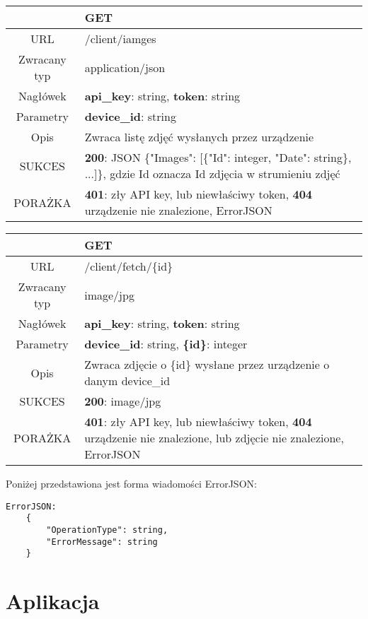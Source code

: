 \begin{description}
		\begin{tabularx}{\linewidth} {|c|X|}
		\hline
						& {\bf GET}\\ \hline
		  URL 			& /client/iamges\\
		  Zwracany typ 	& application/json\\
		  Nagłówek 		& {\bf api\_key}: string, {\bf token}: string\\
		  Parametry 	& {\bf device\_id}: string\\
		  Opis 			& Zwraca listę zdjęć wysłanych przez urządzenie \\
		  SUKCES 		& {\bf 200}: JSON \{"Images": [\{"Id": integer, "Date": string\}, ...]\}, gdzie Id oznacza Id zdjęcia w strumieniu zdjęć \\
		  PORAŻKA 		& {\bf 401}: zły API key, lub niewłaściwy token, {\bf 404} urządzenie nie znalezione, ErrorJSON\\
		  \hline
		\end{tabularx}
		
		\begin{tabularx}{\linewidth} {|c|X|}
		\hline
						& {\bf GET}\\ \hline
		  URL 			&  /client/fetch/\{id\} \\ 
  		  Zwracany typ 	& image/jpg\\
		  Nagłówek 		& {\bf api\_key}: string, {\bf token}: string\\
		  Parametry 	& {\bf device\_id}: string, {\bf \{id\}}: integer\\
		  Opis 			& Zwraca zdjęcie o \{id\} wysłane przez urządzenie o danym device\_id\\
		  SUKCES 		& {\bf 200}: image/jpg\\
		  PORAŻKA 		& {\bf 401}: zły API key, lub niewłaściwy token, {\bf 404} urządzenie nie znalezione, lub zdjęcie nie znalezione, ErrorJSON\\

		  \hline
		\end{tabularx}

\end{description}

Poniżej przedstawiona jest forma wiadomości ErrorJSON:

\begin{lstlisting}
ErrorJSON:
	{
		"OperationType": string, 
		"ErrorMessage": string
	}
\end{lstlisting}
	
\section{Aplikacja}
\label{sec:aplikacja}

